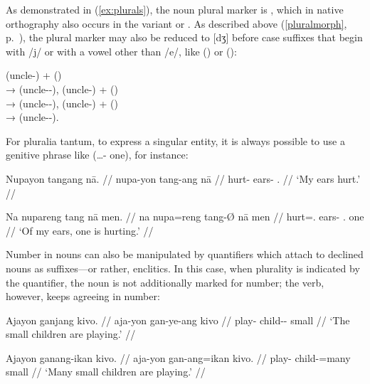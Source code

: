 As demonstrated in (\ref{ex:plurals}), the noun plural marker is 
, which in native orthography also occurs in the variant 
 or . As described above (\autoref{pluralmorph}, 
p.~\pageref{pluralmorph}), the plural marker may also be reduced to [dʒ] 
 before case suffixes that begin with /j/ or with a vowel other than 
/e/, like  (\Aarg{}) or  (\Dat{}):

\pex
	\a {} (uncle-\Aarg{})
		+  (\Pl{}) \\[0.5\baselineskip]
		→  (uncle-\Pl{}-\Aarg{}),
	\a {} (uncle-\Gen{})
		+  (\Pl{}) \\[0.5\baselineskip]
		→  (uncle-\Pl{}-\Gen{}),
	\a {} (uncle-\Dat{})
		+  (\Pl{}) \\[0.5\baselineskip]
		→  (uncle-\Pl{}-\Dat{}).
\xe

For pluralia tantum, to express a singular entity, it is always possible to 
use a genitive phrase like  (…-\Gen{} 
one), for instance:

\pex
\a\begingl
	\gla Nupayon tangang nā. //
	\glb nupa-yon tang-ang nā //
	\glc hurt-\TplN{} ears-\Aarg{} \Fsg{}.\Gen{} //
	\glft `My ears hurt.' //
\endgl

\a\label{ex:gensubj}\begingl
	\gla Na nupareng tang nā men. //
	\glb na nupa=reng tang-Ø nā men //
	\glc \GenT{} hurt=\TsgI{}.\Aarg{} ears-\Top{} \Fsg{}.\Gen{} one //
	\glft `Of my ears, one is hurting.' //
\endgl
\xe

Number in nouns can also be manipulated by quantifiers which attach to declined
nouns as suffixes---or rather, enclitics. In this case, when plurality is
indicated by the quantifier, the noun is not additionally marked for number;
the verb, however, keeps agreeing in number:

\pex
\a\begingl
	\gla Ajayon ganjang kivo. //
	\glb aja-yon gan-ye-ang kivo //
	\glc play-\TsgN{} child-\Pl{}-\Aarg{} small //
	\glft `The small children are playing.' //
\endgl
	
\a\label{ex:nounquant}\begingl
	\gla Ajayon ganang-ikan kivo. //
	\glb aja-yon gan-ang=ikan kivo. //
	\glc play-\TsgN{} child-\Aarg{}=many small //
	\glft `Many small children are playing.' //
\endgl


